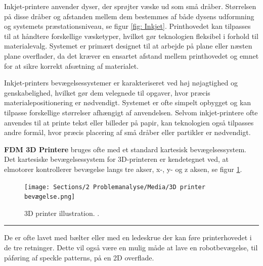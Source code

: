 Inkjet-printere anvender dyser, der sprøjter væske ud som små dråber. Størrelsen på disse dråber og afstanden mellem dem bestemmes af både dysens udformning og systemets præstationsniveau, se figur \ref{fig: Inkjet}. Printhovedet kan tilpasses til at håndtere forskellige væsketyper, hvilket gør teknologien fleksibel i forhold til materialevalg. Systemet er primært designet til at arbejde på plane eller næsten plane overflader, da det kræver en ensartet afstand mellem printhovedet og emnet for at sikre korrekt afsætning af materialet.\parencite{Delaney2009InkjetProteins} 

Inkjet-printers bevægelsessystemer er karakteriseret ved høj nøjagtighed og genskabelighed, hvilket gør dem velegnede til opgaver, hvor præcis materialepositionering er nødvendigt. Systemet er ofte simpelt opbygget og kan tilpasse forskellige størrelser afhængigt af anvendelsen. Selvom inkjet-printere ofte anvendes til at printe tekst eller billeder på papir, kan teknologien også tilpasses andre formål, hvor præcis placering af små dråber eller partikler er nødvendigt.


\textbf{FDM 3D Printere} bruges ofte med et standard kartesisk bevægelsessystem.  Det kartesiske bevægelsessystem for 3D-printeren er kendetegnet ved, at elmotorer kontrollerer bevægelse langs tre akser, x-, y- og z aksen, se figur \ref{fig:3D printer}.

\begin{figure} [H]
    \centering
    \texttt{[image: Sections/2 Problemanalyse/Media/3D printer bevægelse.png]}
    \caption{3D printer illustration. \parencite{Mueller20203DDraft}. }
    \label{fig:3D printer}
\end{figure}\plainbreak{-0.5}

 De er ofte lavet med bælter eller med en ledeskrue der kan føre printerhovedet i de tre retninger. Dette vil også være en mulig måde at lave en robotbevægelse, til påføring af speckle patterns, på en 2D overflade. \parencite{Billington20243DOverview}